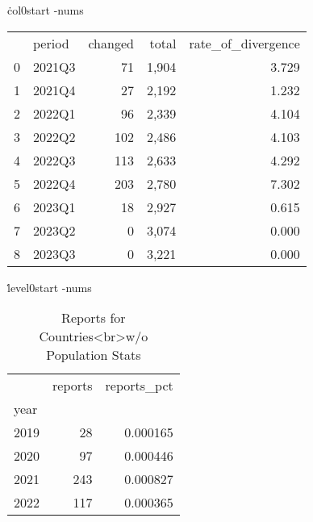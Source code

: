 \begin{table}
\centering
\.col0start
\tabular-nums
\begin{tabular}{llrrr}
 & period & changed & total & rate_of_divergence \\
0 & 2021Q3 & 71 & 1,904 & 3.729 \\
1 & 2021Q4 & 27 & 2,192 & 1.232 \\
2 & 2022Q1 & 96 & 2,339 & 4.104 \\
3 & 2022Q2 & 102 & 2,486 & 4.103 \\
4 & 2022Q3 & 113 & 2,633 & 4.292 \\
5 & 2022Q4 & 203 & 2,780 & 7.302 \\
6 & 2023Q1 & 18 & 2,927 & 0.615 \\
7 & 2023Q2 & 0 & 3,074 & 0.000 \\
8 & 2023Q3 & 0 & 3,221 & 0.000 \\
\end{tabular}
\end{table}

\begin{table}
\centering
\caption{Reports for Countries<br>w/o Population Stats}
\.level0start
\tabular-nums
\begin{tabular}{lrr}
 & reports & reports_pct \\
year &  &  \\
2019 & 28 & 0.000165 \\
2020 & 97 & 0.000446 \\
2021 & 243 & 0.000827 \\
2022 & 117 & 0.000365 \\
\end{tabular}
\end{table}

